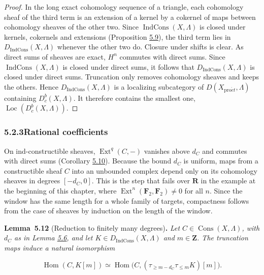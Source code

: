 \documentclass[11pt]{article}
\newenvironment{bpstatement}[2]{\par\addvspace{0.6\baselineskip}\noindent\textbf{#1}#2\textbf{.}\enspace\ignorespaces}
  {\par\addvspace{0.4\baselineskip}}
\newenvironment{bpstatementit}[2]{\begin{bpstatement}{#1}{#2}\itshape\ignorespaces}{\end{bpstatement}}
\providecommand{\Cons}{}\renewcommand{\Cons}{\operatorname{Cons}}
\providecommand{\Dbc}{}\renewcommand{\Dbc}{D^b_c}
\providecommand{\Dic}{}\renewcommand{\Dic}{D_{\IndCons}}
\providecommand{\Ext}{}\renewcommand{\Ext}{\operatorname{Ext}}
\providecommand{\Hom}{}\renewcommand{\Hom}{\operatorname{Hom}}
\providecommand{\IndCons}{}\renewcommand{\IndCons}{\operatorname{IndCons}}
\providecommand{\Loc}{}\renewcommand{\Loc}{\operatorname{Loc}}
\begin{document}
\begin{proof}[{Proof}]\label{bp34}%
In the long exact cohomology sequence of a triangle, each cohomology sheaf of the third term is an extension of a kernel by a cokernel of maps between cohomology sheaves of the other two. Since \(\IndCons(X,\Lambda)\) is closed under kernels, cokernels and extensions (Proposition \hyperref[bp27]{5.9}), the third term lies in \(\Dic(X,\Lambda)\) whenever the other two do. Closure under shifts is clear. As direct sums of sheaves are exact, \(H^n\) commutes with direct sums. Since \(\IndCons(X,\Lambda)\) is closed under direct sums, it follows that \(\Dic(X,\Lambda)\) is closed under direct sums. Truncation only removes cohomology sheaves and keeps the others. Hence \(\Dic(X,\Lambda)\) is a localizing subcategory of \(D(X_{\mathrm{pro}\acute{e}t},\Lambda)\) containing \(\Dbc(X,\Lambda)\). It therefore contains the smallest one, \(\Loc(\Dbc(X,\Lambda))\).
\end{proof}


\subsubsection*{\texorpdfstring{5.2.3\quad Rational coefficients}{5.2.3 Rational coefficients}}
\label{bp35}%
\label{bp36}%
On ind-constructible sheaves, \(\Ext^q(C,-)\) vanishes above \(d_C\) and commutes with direct sums (Corollary \hyperref[bp30]{5.10}). Because the bound \(d_C\) is uniform, maps from a constructible sheaf \(C\) into an unbounded complex depend only on its cohomology sheaves in degrees \([-d_C,0]\). This is the step that fails over \(\mathbf R\) in the example at the beginning of this chapter, where \(\Ext^n(\mathbf F_2,\mathbf F_2)\neq0\) for all \(n\). Since the window has the same length for a whole family of targets, compactness follows from the case of sheaves by induction on the length of the window.

\label{bp37}%
\begin{bpstatementit}{Lemma~5.12}{ (Reduction to finitely many degrees)}
Let \(C\in\Cons(X,\Lambda)\), with \(d_C\) as in Lemma \hyperref[bp20]{5.6}, and let \(K\in\Dic(X,\Lambda)\) and \(m\in\mathbf Z\). The truncation maps induce a natural isomorphism

\[
\Hom(C,K[m])
\simeq\Hom\bigl(C,(\tau_{\geq m-d_C}\tau_{\leq m}K)[m]\bigr).
\tag{5.3}
\]
\end{bpstatementit}
\end{document}
